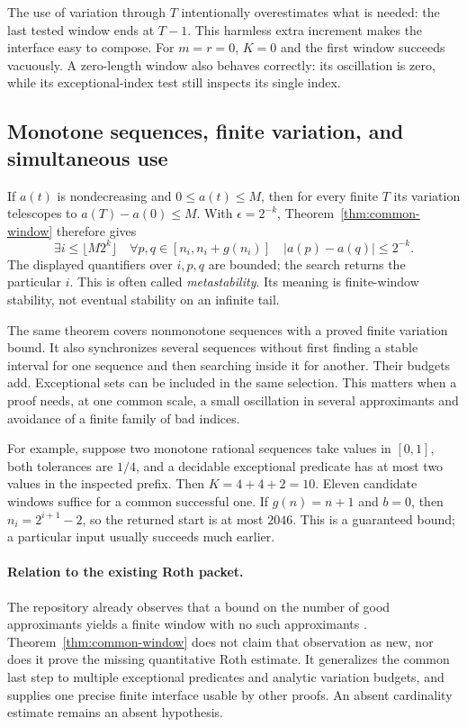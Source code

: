 The use of variation through $T$ intentionally overestimates what is
needed: the last tested window ends at $T-1$. This harmless extra
increment makes the interface easy to compose. For $m=r=0$, $K=0$ and
the first window succeeds vacuously. A zero-length window also behaves
correctly: its oscillation is zero, while its exceptional-index test
still inspects its single index.

\subsection{Monotone sequences, finite variation, and simultaneous use}

If $a(t)$ is nondecreasing and $0\leq a(t)\leq M$, then for every finite
$T$ its variation telescopes to $a(T)-a(0)\leq M$. With
$\epsilon=2^{-k}$, Theorem~\ref{thm:common-window} therefore gives
\[
 \exists i\leq \lfloor M2^k\rfloor\quad
 \forall p,q\in[n_i,n_i+g(n_i)]\quad |a(p)-a(q)|\leq2^{-k}.
\]
The displayed quantifiers over $i,p,q$ are bounded; the search returns
the particular $i$. This is often called \emph{metastability}. Its
meaning is finite-window stability, not eventual stability on an
infinite tail.

The same theorem covers nonmonotone sequences with a proved finite
variation bound. It also synchronizes several sequences without first
finding a stable interval for one sequence and then searching inside it
for another. Their budgets add. Exceptional sets can be included in
the same selection. This matters when a proof needs, at one common
scale, a small oscillation in several approximants and avoidance of a
finite family of bad indices.

For example, suppose two monotone rational sequences take values in
$[0,1]$, both tolerances are $1/4$, and a decidable exceptional predicate
has at most two values in the inspected prefix. Then $K=4+4+2=10$.
Eleven candidate windows suffice for a common successful one. If
$g(n)=n+1$ and $b=0$, then $n_i=2^{i+1}-2$, so the returned start is
at most $2046$. This is a guaranteed bound; a particular input usually
succeeds much earlier.

\paragraph{Relation to the existing Roth packet.}
The repository already observes that a bound on the number of good
approximants yields a finite window with no such approximants
\cite{ProveIt}. Theorem~\ref{thm:common-window} does not claim that
observation as new, nor does it prove the missing quantitative Roth
estimate. It generalizes the common last step to multiple exceptional
predicates and analytic variation budgets, and supplies one precise
finite interface usable by other proofs. An absent cardinality estimate
remains an absent hypothesis.

